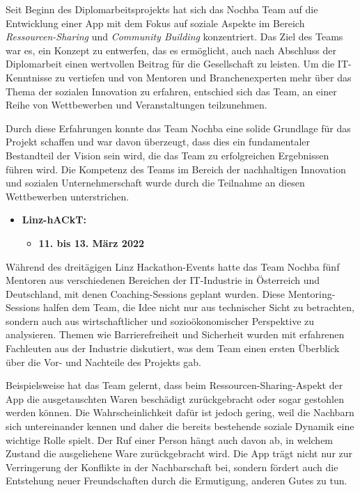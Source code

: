 Seit Beginn des Diplomarbeitsprojekts hat sich das Nochba Team auf die Entwicklung einer App mit dem Fokus auf soziale Aspekte im Bereich \textit{Ressourcen-Sharing} und \textit{Community Building} konzentriert. Das Ziel des Teams war es, ein Konzept zu entwerfen, das es ermöglicht, auch nach Abschluss der Diplomarbeit einen wertvollen Beitrag für die Gesellschaft zu leisten. Um die IT-Kenntnisse zu vertiefen und von Mentoren und Branchenexperten mehr über das Thema der sozialen Innovation zu erfahren, entschied sich das Team, an einer Reihe von Wettbewerben und Veranstaltungen teilzunehmen.

Durch diese Erfahrungen konnte das Team Nochba eine solide Grundlage für das Projekt schaffen und war davon überzeugt, dass dies ein fundamentaler Bestandteil der Vision sein wird, die das Team zu erfolgreichen Ergebnissen führen wird. Die Kompetenz des Teams im Bereich der nachhaltigen Innovation und sozialen Unternehmerschaft wurde durch die Teilnahme an diesen Wettbewerben unterstrichen.

\begin{itemize}
    \item \textbf{Linz-hACkT:}
          \begin{itemize}
              \item \textbf{11. bis 13. März 2022}
          \end{itemize}
\end{itemize}

Während des dreitägigen Linz Hackathon-Events \cite{LinzInnovationshauptplatz} hatte das Team Nochba fünf Mentoren aus verschiedenen Bereichen der IT-Industrie in Österreich und Deutschland, mit denen Coaching-Sessions geplant wurden. Diese Mentoring-Sessions halfen dem Team, die Idee nicht nur aus technischer Sicht zu betrachten, sondern auch aus wirtschaftlicher und sozioökonomischer Perspektive zu analysieren. Themen wie Barrierefreiheit und Sicherheit wurden mit erfahrenen Fachleuten aus der Industrie diskutiert, was dem Team einen ersten Überblick über die Vor- und Nachteile des Projekts gab.

Beispielsweise hat das Team gelernt, dass beim Ressourcen-Sharing-Aspekt der App die ausgetauschten Waren beschädigt zurückgebracht oder sogar gestohlen werden können. Die Wahrscheinlichkeit dafür ist jedoch gering, weil die Nachbarn sich untereinander kennen und daher die bereits bestehende soziale Dynamik eine wichtige Rolle spielt. Der Ruf einer Person hängt auch davon ab, in welchem Zustand die ausgeliehene Ware zurückgebracht wird. Die App trägt nicht nur zur Verringerung der Konflikte in der Nachbarschaft bei, sondern fördert auch die Entstehung neuer Freundschaften durch die Ermutigung, anderen Gutes zu tun.

